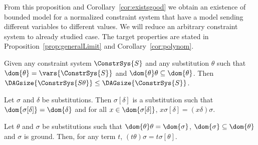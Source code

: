From this proposition and Corollary~\ref{cor:existsgood} we obtain an existence of bounded model 
for a normalized constraint system 
that have a model sending different variables to different values.
We will reduce an arbitrary constraint system to already studied case. 
The target properties are stated in Proposition~\ref{prop:generalLimit} and Corollary~\ref{cor:polynom}.

\begin{lemma}\label{lemma:sizesubst}
Given any constraint system $\ConstrSys{S}$ and any substitution $\theta$ such that $\dom{\theta}=\vars{\ConstrSys{S}}$ and $\dom{\theta}\theta \subseteq \dom{\theta}$.	Then $\DAGsize{\ConstrSys{S\theta}}\leq\DAGsize{\ConstrSys{S}}$.
\end{lemma}



\begin{df}
	Let $\sigma$ and $\delta$ be substitutions. Then $\sigma[\delta]$ is a substitution such that $\dom{\sigma[\delta]} = \dom{\delta}$ and for all $x\in\dom{\sigma[\delta]}$, $x\sigma[\delta] = (x\delta)\sigma$.
\end{df}


\begin{lemma}\label{lemma:substcomp}
	Let $\theta$ and $\sigma$ be substitutions such that $\dom{\theta}\theta=\dom{\sigma}$, $\dom{\sigma}\subseteq \dom{\theta}$ and $\sigma$ is ground. Then, for any term $t$, $(t\theta)\sigma= t\sigma[\theta]$.
\end{lemma}



